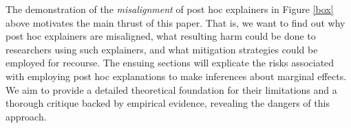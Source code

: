 \documentclass[12pt]{article}  %
\begin{document}
The demonstration of the \textit{misalignment} %
of post hoc explainers in Figure \ref{box} above motivates the main thrust of this paper. That is, we want to find out why post hoc explainers are misaligned, what resulting harm could be done to researchers using such explainers, and what mitigation strategies could be employed for recourse. 
The ensuing sections will explicate the risks associated with employing post hoc explanations to make inferences about marginal effects. We aim to provide a detailed theoretical foundation for their limitations and a thorough critique backed by empirical evidence, revealing the dangers of this approach.
\end{document}
